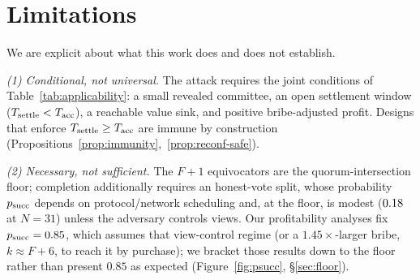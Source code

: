 \section{Limitations}
\label{sec:limitations}

\providecommand{\ArtifactPosCtrlMode}{the fast-exit positive control is an in-process \texttt{shadow} rehearsal}
\providecommand{\ArtifactPairedMode}{the paired race is an in-process \texttt{shadow} rehearsal}
\providecommand{\ArtifactRqEightRemains}{to replace the in-process rehearsal of the paired race with the real-client-code localnet run}

We are explicit about what this work does and does not establish.

\emph{(1) Conditional, not universal.} The attack requires the joint conditions of
Table~\ref{tab:applicability}: a small revealed committee, an open settlement window
($T_{\mathrm{settle}}<T_{\mathrm{acc}}$), a reachable value sink, and positive bribe-adjusted profit. Designs that enforce
$T_{\mathrm{settle}}\ge T_{\mathrm{acc}}$ are immune by construction (Propositions~\ref{prop:immunity},~\ref{prop:reconf-safe}).

\emph{(2) Necessary, not sufficient.} The $F{+}1$ equivocators are the quorum-intersection floor;
completion additionally requires an honest-vote split, whose probability $p_{\mathrm{succ}}$ depends on
protocol/network scheduling and, at the floor, is modest ($0.18$ at $N=31$) unless the
adversary controls views. Our profitability analyses fix $p_{\mathrm{succ}}=0.85$, which assumes that
view-control regime (or a $1.45\times$-larger bribe, $k\approx F{+}6$, to reach it by purchase); we
bracket those results down to the floor rather than present $0.85$ as expected
(Figure~\ref{fig:psucc}, \S\ref{sec:floor}).

